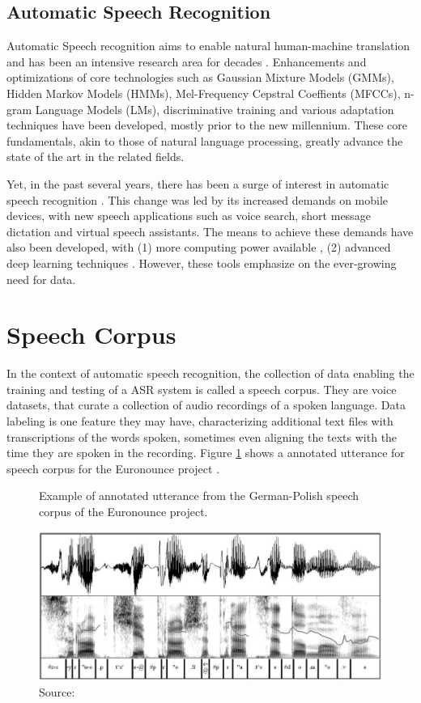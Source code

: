 \subsection{Automatic Speech Recognition}

Automatic Speech recognition aims to enable natural human-machine translation and has been an intensive research area for decades \cite{yu2016automatic}. Enhancements and optimizations of core technologies such as Gaussian Mixture Models (GMMs), Hidden Markov Models (HMMs), Mel-Frequency Cepstral Coeffients (MFCCs), n-gram Language Models (LMs), discriminative training and various adaptation techniques have been developed, mostly prior to the new millennium. These core fundamentals, akin to those of natural language processing, greatly advance the state of the art in the related fields.

Yet, in the past several years, there has been a surge of interest in automatic speech recognition \cite{jurafsky2016speech}. This change was led by its increased demands on mobile devices, with new speech applications such as voice search, short message dictation and virtual speech assistants. The means to achieve these demands have also been developed, with (1) more computing power available \cite{ECONOMOU2004279}, (2) advanced deep learning techniques \cite{graves2013speech}. However, these tools emphasize on the ever-growing need for data.

\section{Speech Corpus}

In the context of automatic speech recognition, the collection of data enabling the training and testing of a ASR system is called a speech corpus. They are voice datasets, that curate a collection of audio recordings of a spoken language. Data labeling is one feature they may have, characterizing additional text files with transcriptions of the words spoken, sometimes even aligning the texts with the time they are spoken in the recording. Figure \ref{fig:annotated-speech-corpus} shows a annotated utterance for speech corpus for the Euronounce project \cite{demenko2009applying}.

\begin{figure}[ht]
    \centering
    \caption{Example of annotated utterance from the German-Polish speech corpus of the Euronounce project.}
    \includegraphics[width=0.8\linewidth]{images/background/annotated-speech-corpus.png}
    \caption*{Source: \cite{demenko2009applying}}
    \label{fig:annotated-speech-corpus}
\end{figure}

